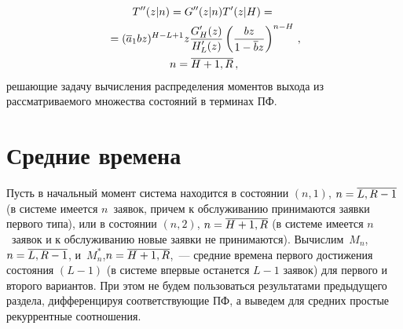 \begin{multicols}{2}

\noindent
\begin{multline*}
T''(z|n) = G''(z|n) T'(z|H) = {}\\
{}=(\overline{a}_1 b z)^{H-L+1}
z \displaystyle\frac{\displaystyle G'_{H}(z)\mathstrut}{\displaystyle H'_{L}(z)\mathstrut} \left(
\displaystyle\frac{\displaystyle b z\mathstrut}{\displaystyle 1 - \overline{b} z\mathstrut} \right)^{n-H} \,,\\
n=\overline{H+1,R}\,,
\end{multline*}
решающие задачу вычисления распределения моментов
выхода из рассматриваемого множества состояний в терминах ПФ.

\section{Средние времена}

Пусть в начальный момент система находится в
состоянии $(n,1)$, $n\hm=\overline{L,R-1}$
(в системе имеется $n$~заявок, причем к
обслуживанию принимаются заявки первого типа),
или в со\-сто\-янии $(n,2)$, $n\hm=\overline{H+1,R}$
(в системе имеется $n$~заявок и к обслуживанию новые заявки не принимаются).
Вы\-чис\-лим~$M_n$, $n\hm=\overline{L,R-1}$, и~$M^*_n$,\linebreak $n\hm=\overline{H+1,R}$,~--- средние
времена первого достижения состояния $(L-1)$
(в системе впервые останется $L-1$ заявок) для первого и второго вариантов.
При этом не будем пользоваться результатами
предыдущего раздела, дифференцируя соответствующие
ПФ, а выведем для средних простые рекуррентные соотношения.


\end{multicols}

